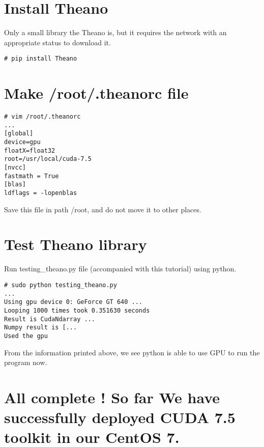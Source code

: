 \documentclass[UTF8,a4paper,12pt]{article}
\begin{document}
\section{Install Theano}
Only a small library the Theano is, but it requires the network with an appropriate status to download it.
\begin{lstlisting}
# pip install Theano
\end{lstlisting}

\section{Make /root/.theanorc file}
\begin{lstlisting}
# vim /root/.theanorc
...
[global]
device=gpu
floatX=float32
root=/usr/local/cuda-7.5
[nvcc]
fastmath = True
[blas]
ldflags = -lopenblas
\end{lstlisting}
Save this file in path /root, and do not move it to other places.

\section{Test Theano library}
Run testing\_theano.py file (accompanied with this tutorial) using python.
\begin{lstlisting}
# sudo python testing_theano.py
...
Using gpu device 0: GeForce GT 640 ...
Looping 1000 times took 0.351630 seconds
Result is CudaNdarray ...
Numpy result is [...
Used the gpu
\end{lstlisting}
From the information printed above, we see python is able to use GPU to run the program now.

\section*{All complete ! So far We have successfully deployed CUDA 7.5 toolkit in our CentOS 7.}
\end{document}
